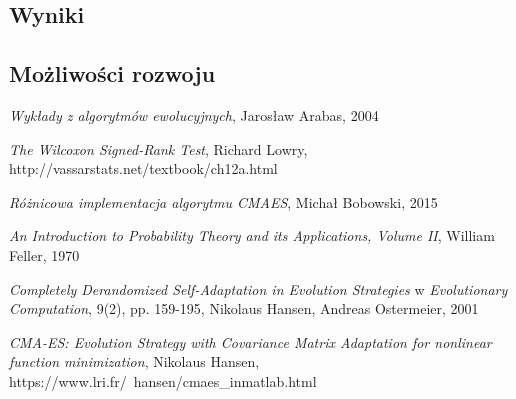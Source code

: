 \documentclass{mini}
\begin{document}
\subsection{Wyniki}

\subsection{Możliwości rozwoju}

\pagebreak

\begin{thebibliography}{9}

\emph{Wykłady z algorytmów ewolucyjnych}, Jarosław Arabas, 2004

\emph{The Wilcoxon Signed-Rank Test}, Richard Lowry,\\http://vassarstats.net/textbook/ch12a.html

\emph{Różnicowa implementacja algorytmu CMAES}, Michał Bobowski, 2015

\emph{An Introduction to Probability Theory and its Applications, Volume II}, William Feller, 1970

\emph{Completely Derandomized Self-Adaptation in Evolution Strategies} w \emph{Evolutionary Computation}, 9(2), pp. 159-195, Nikolaus Hansen, Andreas Ostermeier, 2001

\emph{CMA-ES: Evolution Strategy with Covariance Matrix Adaptation for nonlinear function minimization}, Nikolaus Hansen,\\https://www.lri.fr/~hansen/cmaes\_inmatlab.html


\end{thebibliography}

\makestatement
\end{document}
